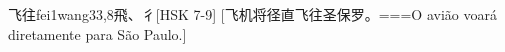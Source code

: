 \begin{EntryWithPhonetic}{飞往}{fei1wang3}{3,8}{⾶、⼻}[HSK 7-9]
  [飞机将径直飞往圣保罗。===O avião voará diretamente para São Paulo.]
\end{EntryWithPhonetic}
